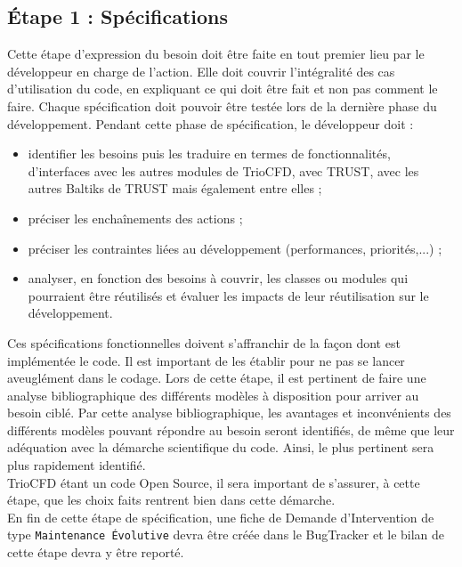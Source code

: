 \subsection{\label{subsec:specif}Étape 1 : Sp\'ecifications}
Cette étape d'expression du besoin doit être faite en tout premier lieu par le développeur en charge de l'action.
Elle doit couvrir l'intégralité des cas d'utilisation du code,
en expliquant ce qui doit être fait et non pas comment le faire.
Chaque spécification doit pouvoir être testée lors de la dernière phase du développement.
Pendant cette phase de spécification, le développeur doit :
\begin{itemize}[label=$\Rightarrow$, font=\LARGE]
   \item identifier les besoins puis les traduire en termes de fonctionnalités,
         d'interfaces avec les autres modules de TrioCFD, avec TRUST,
         avec les autres Baltiks de TRUST mais également entre elles ;
   \item préciser les enchaînements des actions ;
   \item préciser les contraintes liées au développement (performances, priorités,...) ;
   \item analyser, en fonction des besoins à couvrir, les classes ou modules
         qui pourraient être réutilisés et évaluer les impacts de leur réutilisation sur le développement.
\end{itemize}

Ces spécifications fonctionnelles doivent s'affranchir de la façon dont est implémentée le code.
Il est important de les établir pour ne pas se lancer aveuglément dans le codage.
\newpage
Lors de cette étape, il est pertinent de faire une analyse bibliographique des différents modèles
à disposition pour arriver au besoin ciblé.
Par cette analyse bibliographique, les avantages et inconvénients des différents
modèles pouvant répondre au besoin seront identifiés, de même que leur adéquation
avec la démarche scientifique du code.
Ainsi, le plus pertinent sera plus rapidement identifié.\\
TrioCFD étant un code Open Source, il sera important de s'assurer,
à cette étape, que les choix faits rentrent bien dans cette démarche.\\
En fin de cette étape de spécification, une fiche de Demande d'Intervention
de type \texttt{Maintenance Évolutive} devra être créée dans le BugTracker
et le bilan de cette étape devra y être reporté.


